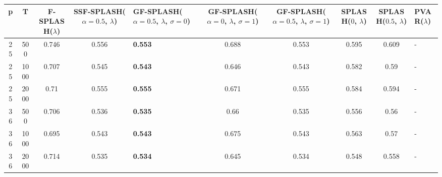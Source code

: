 \begin{tabular}{cccclccccl}
\hline
  p  &  T   &  F-SPLASH($\lambda$)  &  SSF-SPLASH($\alpha=0.5$, $\lambda$)  & GF-SPLASH($\alpha=0.5$, $\lambda$, $\sigma=0$)   &  GF-SPLASH($\alpha=0$, $\lambda$, $\sigma=1$)  &  GF-SPLASH($\alpha=0.5$, $\lambda$, $\sigma=1$)  &  SPLASH($0$, $\lambda$)  &  SPLASH($0.5$, $\lambda$)  & PVAR($\lambda$)   \\
\hline
 25  & 500  &         0.746         &                 0.556                 & \textbf{0.553}                                   &                     0.688                      &                      0.553                       &          0.595           &           0.609            & -                 \\
 25  & 1000 &         0.707         &                 0.545                 & \textbf{0.543}                                   &                     0.646                      &                      0.543                       &          0.582           &            0.59            & -                 \\
 25  & 2000 &         0.71          &                 0.555                 & \textbf{0.555}                                   &                     0.671                      &                      0.555                       &          0.584           &           0.594            & -                 \\
 36  & 500  &         0.706         &                 0.536                 & \textbf{0.535}                                   &                      0.66                      &                      0.535                       &          0.556           &            0.56            & -                 \\
 36  & 1000 &         0.695         &                 0.543                 & \textbf{0.543}                                   &                     0.675                      &                      0.543                       &          0.563           &            0.57            & -                 \\
 36  & 2000 &         0.714         &                 0.535                 & \textbf{0.534}                                   &                     0.645                      &                      0.534                       &          0.548           &           0.558            & -                 \\
\hline
\end{tabular}